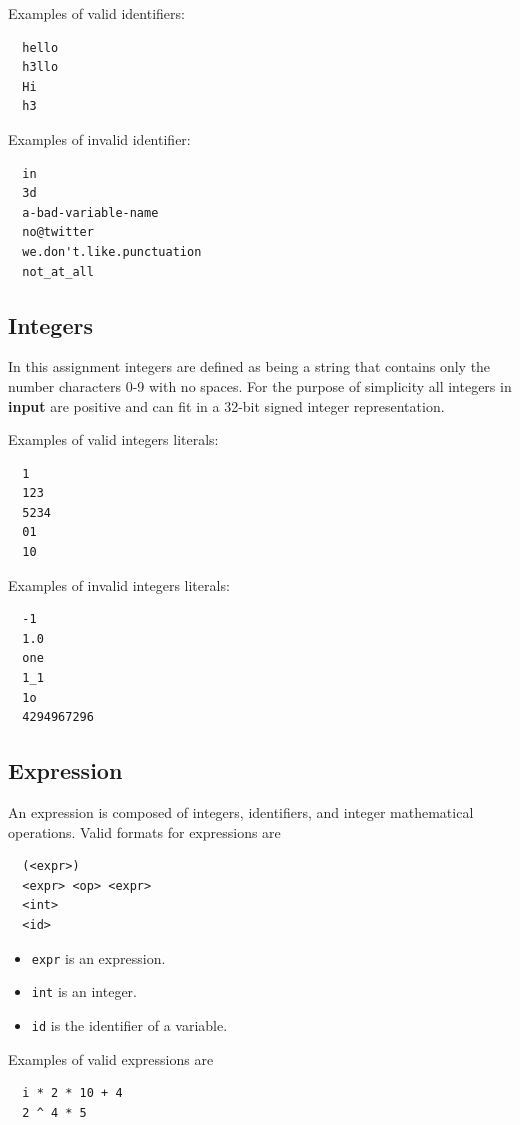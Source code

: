 \documentclass{article}
\newcommand{\code}[1]{\texttt{\textmd{#1}}}
\begin{document}
Examples of valid identifiers:
\begin{lstlisting}
  hello
  h3llo
  Hi
  h3
\end{lstlisting}

Examples of invalid identifier:
\begin{lstlisting}
  in
  3d
  a-bad-variable-name
  no@twitter
  we.don't.like.punctuation
  not_at_all
\end{lstlisting}

\subsection{Integers}
In this assignment integers are defined as being a string that contains only the number characters 0-9 with no
spaces. For the purpose of simplicity all integers in \textbf{input} are positive and can fit in a
32-bit signed integer representation.

Examples of valid integers literals:
\begin{lstlisting}
  1
  123
  5234
  01
  10
\end{lstlisting}

Examples of invalid integers literals:
\begin{lstlisting}
  -1
  1.0
  one
  1_1
  1o
  4294967296
\end{lstlisting}

\subsection{Expression}
An expression is composed of integers, identifiers, and integer mathematical operations. Valid
formats for expressions are
\begin{lstlisting}
  (<expr>)
  <expr> <op> <expr>
  <int>
  <id>
\end{lstlisting}

\begin{itemize}
  \item \code{expr} is an expression.
  \item \code{int} is an integer.
  \item \code{id} is the identifier of a variable.
\end{itemize}

Examples of valid expressions are
\begin{lstlisting}
  i * 2 * 10 + 4
  2 ^ 4 * 5
\end{lstlisting}
\end{document}
